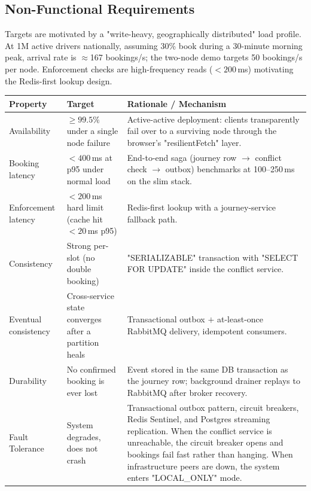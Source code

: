 \documentclass[11pt,a4paper]{article}
\begin{document}
\subsection{Non-Functional Requirements}
\label{sec:nfr}

Targets are motivated by a "write-heavy, geographically distributed" load profile. At 1M active drivers nationally, assuming 30\% book during a 30-minute morning peak, arrival rate is $\approx$167 bookings/s; the two-node demo targets 50 bookings/s per node. Enforcement checks are high-frequency reads ($<200$\,ms) motivating the Redis-first lookup design.

\begin{table}[H]
\centering\small
\begin{tabularx}{\textwidth}{L{3.2cm} L{4.4cm} X}
  \toprule
  \textbf{Property} & \textbf{Target} & \textbf{Rationale / Mechanism} \\
  \midrule
  Availability & $\geq 99.5\%$ under a single node failure & Active-active
        deployment: clients transparently fail over to a surviving node
        through the browser's "resilientFetch" layer. \\
  Booking latency & $<400\,$ms at p95  under normal load & End-to-end saga (journey row $\to$ conflict check $\to$ outbox) benchmarks at 100--250\,ms on the slim stack. \\
  Enforcement latency & $<200\,$ms hard limit (cache hit $<20\,$ms p95) & Redis-first lookup with a journey-service fallback path. \\
  Consistency & Strong per-slot (no double booking) & "SERIALIZABLE"
        transaction with "SELECT FOR UPDATE" inside the conflict
        service. \\
  Eventual consistency & Cross-service state converges after a partition
        heals & Transactional outbox $+$ at-least-once RabbitMQ delivery,
        idempotent consumers. \\
  Durability & No confirmed booking is ever lost & Event stored in the same
        DB transaction as the journey row; background drainer replays to
        RabbitMQ after broker recovery. \\
  Fault Tolerance & System degrades, does not crash & Transactional outbox pattern, circuit breakers, Redis Sentinel, and Postgres streaming replication. When the conflict service is unreachable, the circuit breaker opens and bookings fail fast rather than hanging. When infrastructure peers are down, the system enters "LOCAL\_ONLY" mode. \\

\end{tabularx}
\end{table}
\end{document}
